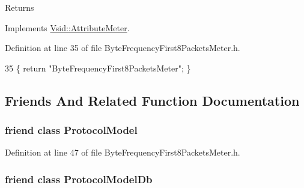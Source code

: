 \begin{DoxyReturn}{Returns}

\end{DoxyReturn}


Implements \hyperlink{class_vsid_1_1_attribute_meter_a24d5a7141e89e948c05edf8f70be8c53}{Vsid\-::\-Attribute\-Meter}.



Definition at line 35 of file Byte\-Frequency\-First8\-Packets\-Meter.\-h.


\begin{DoxyCode}
35 \{ \textcolor{keywordflow}{return} \textcolor{stringliteral}{"ByteFrequencyFirst8PacketsMeter"}; \}
\end{DoxyCode}


\subsection{Friends And Related Function Documentation}
\hypertarget{class_vsid_1_1_byte_frequency_first8_packets_meter_a80219b863d4ff3456933d16bc5f73f45}{
\subsubsection[{Protocol\-Model}]{\setlength{\rightskip}{0pt plus 5cm}friend class {\bf Protocol\-Model}\hspace{0.3cm}{\ttfamily [friend]}}}\label{class_vsid_1_1_byte_frequency_first8_packets_meter_a80219b863d4ff3456933d16bc5f73f45}


Definition at line 47 of file Byte\-Frequency\-First8\-Packets\-Meter.\-h.

\hypertarget{class_vsid_1_1_byte_frequency_first8_packets_meter_a3c0d389e7a9476b06313d8fb9ca9fe68}{
\subsubsection[{Protocol\-Model\-Db}]{\setlength{\rightskip}{0pt plus 5cm}friend class {\bf Protocol\-Model\-Db}\hspace{0.3cm}{\ttfamily [friend]}}}\label{class_vsid_1_1_byte_frequency_first8_packets_meter_a3c0d389e7a9476b06313d8fb9ca9fe68}


